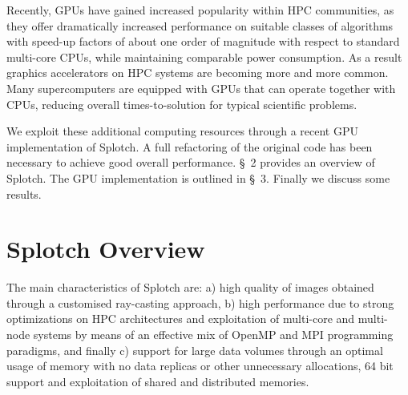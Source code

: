 Recently, GPUs have gained increased popularity within HPC communities, as they offer dramatically increased performance on suitable classes of algorithms with speed-up factors of about one order of magnitude with respect to standard multi-core CPUs, while maintaining comparable power consumption. As a result graphics accelerators on HPC systems are becoming more and more common. Many supercomputers are equipped with GPUs that can operate together with CPUs, reducing overall times-to-solution for typical scientific problems.

We exploit these additional computing resources through a recent GPU implementation of Splotch. A full refactoring of the original code has been necessary to achieve good overall performance. \S~2 provides an overview of Splotch. The GPU implementation is outlined in \S~3. Finally we discuss some results.

\section{Splotch Overview}

The main characteristics of Splotch are: a) high quality of images obtained through a customised ray-casting approach, b) high performance due to strong optimizations on HPC architectures and exploitation of multi-core and multi-node systems by means of an effective mix of OpenMP and MPI programming paradigms, and finally c) support for large data volumes through an optimal usage of memory with no data replicas or other unnecessary allocations, 64 bit support and exploitation of shared and distributed memories.

